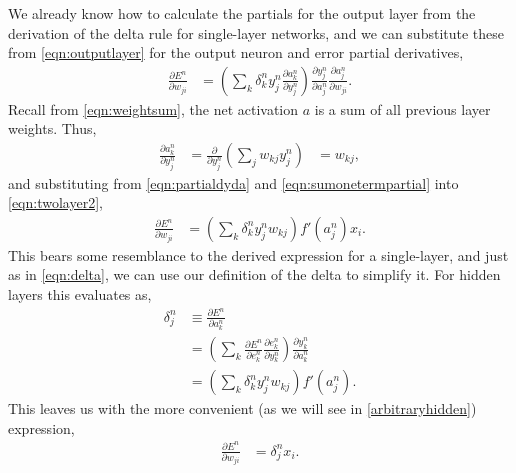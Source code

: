 \documentclass[thesis]{subfiles}
\begin{document}
We already know how to calculate the partials for the output layer from the derivation of the delta rule for single-layer networks, and we can substitute these from \cref{eqn:outputlayer} for the output neuron and error partial derivatives,
%
\begin{equation}
\begin{aligned}
    \frac{\partial E^n}{\partial w_{ji}} &= \left( \sum_k \delta^n_k y^n_j \frac{\partial a^n_k}{\partial y^n_{j}}\right)
     \frac{\partial y^n_{j}}{\partial a^n_{j}} \frac{\partial a^n_{j}}{\partial w_{ji}}.
     \label{eqn:twolayer2}
\end{aligned}
\end{equation}
%
Recall from \cref{eqn:weightsum}, the net activation $a$ is a sum of all previous layer weights. Thus,
\begin{equation}
\begin{aligned}
    \frac{\partial a^n_k}{\partial y^n_{j}} &= \frac{\partial}{\partial y^n_{j}}\left(\sum_j w_{kj} y^n_{j} \right) &= w_{kj},
\end{aligned}
\end{equation}
%
and substituting from \cref{eqn:partialdyda} and \cref{eqn:sumonetermpartial} into \cref{eqn:twolayer2},
\begin{equation}
\begin{aligned}
    \frac{\partial E^n}{\partial w_{ji}} &= \left( \sum_k \delta^n_k y^n_j w_{kj}\right)
     f'\left( a^n_j \right) x_i.
     \label{eqn:twolayer3}
\end{aligned}
\end{equation}
%
This bears some resemblance to the derived expression for a single-layer, and just as in \cref{eqn:delta}, we can use our definition of the delta to simplify it. For hidden layers this evaluates as,
\begin{equation}
\label{eqn:deltahidden}
\begin{aligned}
    \delta^n_j &\equiv \frac{\partial E^n}{\partial a^n_k}\\
    &= \left( \sum_k \frac{\partial E^n}{\partial e^n_{k}} \frac{\partial e^n_{k}}{\partial y^n_{k}} \right) \frac{\partial y^n_{k}}{\partial a^n_k}\\
    &= \left(\sum_k \delta^n_k y^n_j w_{kj} \right) f'\left( a^n_j \right).
\end{aligned}
\end{equation}
%
This leaves us with the more convenient (as we will see in \cref{arbitraryhidden}) expression,
\begin{equation}
\begin{aligned}
    \frac{\partial E^n}{\partial w_{ji}} &=  \delta^n_j x_i.
     \label{eqn:twolayer4}
\end{aligned}
\end{equation}
%
\end{document}
